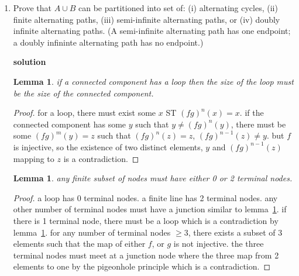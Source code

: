 \documentclass{article}
\newtheorem{lemma}[theorem]{Lemma}
\begin{document}
\begin{enumerate}
\begin{enumerate}
    
                \item Prove that $A \cup B$ can be partitioned into set of: (i) alternating cycles, (ii) finite alternating paths, (iii)
                    semi-infinite alternating paths, or (iv) doubly infinite alternating paths. (A semi-infinite alternating path has one endpoint;
                    a doubly infininte alternating path has no endpoint.)



                

                \textbf{solution}
                
                

                \begin{lemma}\label{lem1}
                    if a connected component has a loop then the size of the loop must be the size of the connected component. 
                \end{lemma}

                \begin{proof}
                    for a loop, there must exist some \(x\) ST \((fg)^n(x)=x\). if the connected component has some \(y\) such that \(y \neq (fg)^n(y)\), there must be some \((fg)^m(y)=z\) such that \((fg)^n(z)=z\), \((fg)^{n-1}(z)\neq y\). but \(f\) is injective, so the existence of two distinct elements, \(y\) and \((fg)^{n-1}(z)\) mapping to \(z\) is a contradiction.
                \end{proof}

                \begin{lemma}\label{lem2}
                    any finite subset of nodes must have either 0 or 2 terminal nodes.
                \end{lemma}

                \begin{proof}
                    a loop has 0 terminal nodes. a finite line has 2 terminal nodes. any other number of terminal nodes must have a junction similar to lemma~\ref{lem1}. if there is 1 terminal node, there must be a loop which is a contradiction by lemma~\ref{lem1}. for any number of terminal nodes \(\geq 3\), there exists a subset of 3 elements such that the map of either \(f\), or \(g\) is not injective. the three terminal nodes must meet at a junction node where the three map from 2 elements to one by the pigeonhole principle which is a contradiction.
                \end{proof}






\end{enumerate}
\end{enumerate}
\end{document}
